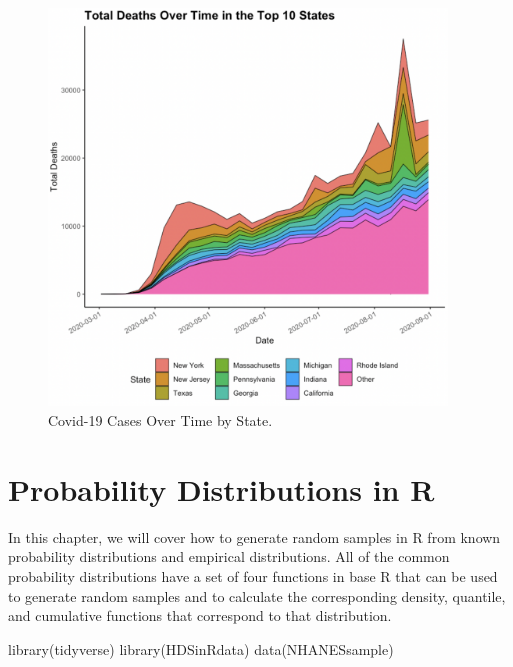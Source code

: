\documentclass[
  letterpaper,
]{krantz}
\makeatletter
\newenvironment{Shaded}{\begin{snugshade}}{\end{snugshade}}
\newcommand{\FunctionTok}[1]{\textcolor[rgb]{0.28,0.35,0.67}{#1}}
\newcommand{\NormalTok}[1]{\textcolor[rgb]{0.00,0.23,0.31}{#1}}
\newenvironment{kframe}{%
\medskip{}
\setlength{\fboxsep}{.8em}
 \def\at@end@of@kframe{}%
 \ifinner\ifhmode%
  \def\at@end@of@kframe{\end{minipage}}%
  \begin{minipage}{\columnwidth}%
 \fi\fi%
 \def\FrameCommand##1{\hskip\@totalleftmargin \hskip-\fboxsep
 \colorbox{shadecolor}{##1}\hskip-\fboxsep
     \hskip-\linewidth \hskip-\@totalleftmargin \hskip\columnwidth}%
 \MakeFramed {\advance\hsize-\width
   \@totalleftmargin\z@ \linewidth\hsize
   \@setminipage}}%
 {\par\unskip\endMakeFramed%
 \at@end@of@kframe}
\renewenvironment{Shaded}{\begin{kframe}}{\end{kframe}}
\makeatother
\begin{document}
\begin{figure}

{\centering \includegraphics[width=4.16667in,height=\textheight]{book/images/7-exercise2plot.png}

}

\caption{\label{fig-q2}Covid-19 Cases Over Time by State.}

\end{figure}


\hypertarget{sec-probability-distributions}{%
\chapter{Probability Distributions in
R}\label{sec-probability-distributions}}

In this chapter, we will cover how to generate random samples in R from
known probability distributions and empirical distributions. All of the
common probability distributions have a set of four functions in base R
that can be used to generate random samples and to calculate the
corresponding density, quantile, and cumulative functions that
correspond to that distribution.

\begin{Shaded}
\begin{Highlighting}[]
\FunctionTok{library}\NormalTok{(tidyverse)}
\FunctionTok{library}\NormalTok{(HDSinRdata)}
\FunctionTok{data}\NormalTok{(NHANESsample)}
\end{Highlighting}
\end{Shaded}
\end{document}
